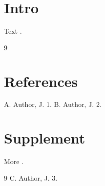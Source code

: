 \documentclass{article}
\begin{document}
\section{Intro}
Text \cite{a,b,c}.
\begin{thebibliography}{9}
\section*{References}
 A. Author, J. 1.
 B. Author, J. 2.
\end{thebibliography}
\section*{Supplement}
More \cite{c}.
\begin{thebibliography}{9}
 C. Author, J. 3.
\end{thebibliography}
\end{document}
